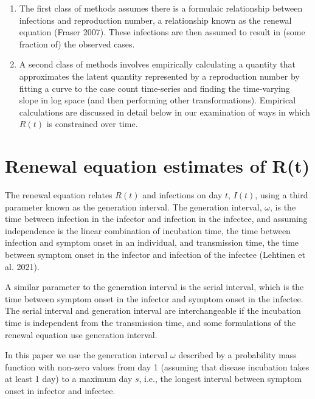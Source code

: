 \documentclass[
  letterpaper,
  DIV=11,
  numbers=noendperiod]{scrreprt}
\begin{document}
\begin{enumerate}
\def\labelenumi{(\arabic{enumi})}
\item
  The first class of methods assumes there is a formulaic relationship
  between infections and reproduction number, a relationship known as
  the renewal equation (Fraser 2007). These infections are then assumed
  to result in (some fraction of) the observed cases.
\item
  A second class of methods involves empirically calculating a quantity
  that approximates the latent quantity represented by a reproduction
  number by fitting a curve to the case count time-series and finding
  the time-varying slope in log space (and then performing other
  transformations). Empirical calculations are discussed in detail below
  in our examination of ways in which \(R(t)\) is constrained over time.
\end{enumerate}

\section*{Renewal equation estimates of
R(t)}\label{renewal-equation-estimates-of-rt}


The renewal equation relates \(R(t)\) and infections on day \(t\),
\(I(t)\), using a third parameter known as the generation interval. The
generation interval, \(ω\), is the time between infection in the
infector and infection in the infectee, and assuming independence is the
linear combination of incubation time, the time between infection and
symptom onset in an individual, and transmission time, the time between
symptom onset in the infector and infection of the infectee (Lehtinen et
al. 2021).

A similar parameter to the generation interval is the serial interval,
which is the time between symptom onset in the infector and symptom
onset in the infectee. The serial interval and generation interval are
interchangeable if the incubation time is independent from the
transmission time, and some formulations of the renewal equation use
generation interval.

In this paper we use the generation interval \(ω\) described by a
probability mass function with non-zero values from day 1 (assuming that
disease incubation takes at least 1 day) to a maximum day \(s\), i.e.,
the longest interval between symptom onset in infector and infectee.
\end{document}
